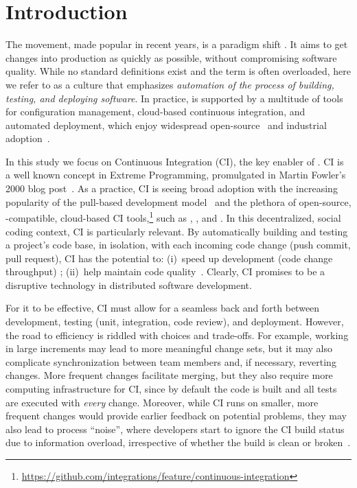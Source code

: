 
\section{Introduction}

The \DO movement, made popular in recent years, is a paradigm shift 
\cite{degrandis2011devops, loukides2012devops, humble2011enterprises, 
roche2013adopting}.
It aims to get changes into production as quickly as 
possible, without compromising software quality.
While no standard definitions exist and the term is often overloaded, here
we refer to \DO as a culture that emphasizes \emph{automation of the 
process of building, testing, and deploying software}.
In practice, \DO is supported by a multitude of tools for configuration management, 
cloud-based continuous integration, and automated deployment,
which enjoy widespread open-source~\cite{Hilton2016} and industrial 
adoption~\cite{rightscale, hilton2016continuous}.

In this study we focus on Continuous Integration (CI), the key enabler of \DO.
CI is a well known concept in Extreme Programming, promulgated in 
Martin Fowler's 2000 blog post~\cite{fowler2000continuous}.
As a practice, CI is seeing broad adoption with the increasing popularity
of the \GH pull-based development model~\cite{gousios2014exploratory}
and the plethora of open-source, \GH-compatible, cloud-based CI 
tools,\footnote{\url{https://github.com/integrations/feature/continuous-integration}}
such as \Tvis, \CB, and \CCI.
In this decentralized, social coding context, CI is particularly relevant. 
By automatically building and testing a project's code base, in isolation, 
with each incoming code change (\ie push commit, pull request), CI 
has the potential to: (i)~speed up development (code change throughput)
\cite{Stolberg, pham2013creating, Hilton2016};
(ii)~help maintain code quality~\cite{VasilescuYWDF15, gousios2015work}.
Clearly, CI promises to be a disruptive technology in distributed software
development.

For it to be effective, CI must allow for a seamless back and forth between
development, testing (\eg unit, integration, code review), and deployment. 
However, the road to efficiency is riddled with choices and trade-offs.
For example, working in large increments may lead to more meaningful
change sets, but it may also complicate synchronization between team 
members and, if necessary, reverting changes.
More frequent changes facilitate merging, but they also require more 
computing infrastructure for CI, since by default the code is built and all 
tests are executed with \emph{every} change.
Moreover, while CI runs on smaller, more frequent changes would provide 
earlier feedback on potential problems, they may also lead to process 
``noise'', where developers start to ignore the CI build status due to 
information overload, irrespective of whether the build is clean or 
broken~\cite{DeadCI}.

